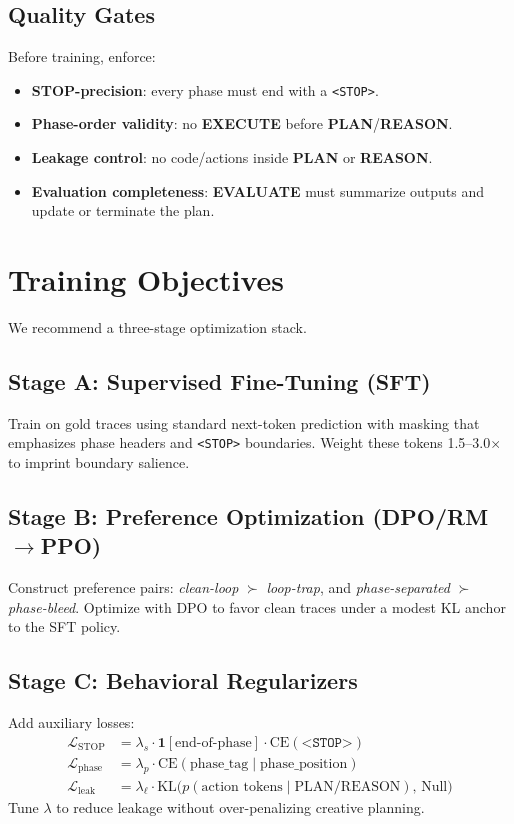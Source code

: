 \documentclass[11pt]{article}
\begin{document}
\subsection{Quality Gates}
Before training, enforce:
\begin{itemize}[leftmargin=2em]
  \item \textbf{STOP-precision}: every phase must end with a \texttt{<STOP>}.
  \item \textbf{Phase-order validity}: no \textbf{EXECUTE} before \textbf{PLAN}/\textbf{REASON}.
  \item \textbf{Leakage control}: no code/actions inside \textbf{PLAN} or \textbf{REASON}.
  \item \textbf{Evaluation completeness}: \textbf{EVALUATE} must summarize outputs and update or terminate the plan.
\end{itemize}

\section{Training Objectives}
We recommend a three-stage optimization stack.

\subsection{Stage A: Supervised Fine-Tuning (SFT)}
Train on gold traces using standard next-token prediction with masking that
emphasizes phase headers and \texttt{<STOP>} boundaries. Weight these tokens 1.5--3.0$\times$
to imprint boundary salience.

\subsection{Stage B: Preference Optimization (DPO/RM$\rightarrow$PPO)}
Construct preference pairs:
\emph{clean-loop} $\succ$ \emph{loop-trap}, and
\emph{phase-separated} $\succ$ \emph{phase-bleed}.
Optimize with DPO to favor clean traces under a modest KL anchor to the SFT policy.

\subsection{Stage C: Behavioral Regularizers}
Add auxiliary losses:
\begin{align}
\mathcal{L}_{\text{STOP}} &= \lambda_{s}\cdot \mathbf{1}[\text{end-of-phase}]\cdot \mathrm{CE}(\texttt{<STOP>}) \\
\mathcal{L}_{\text{phase}} &= \lambda_{p}\cdot \mathrm{CE}(\text{phase\_tag}\mid \text{phase\_position}) \\
\mathcal{L}_{\text{leak}} &= \lambda_{\ell}\cdot \mathrm{KL}\big(p(\text{action tokens} \mid \text{PLAN/REASON}),\, \text{Null}\big)
\end{align}
Tune $\lambda$ to reduce leakage without over-penalizing creative planning.
\end{document}
